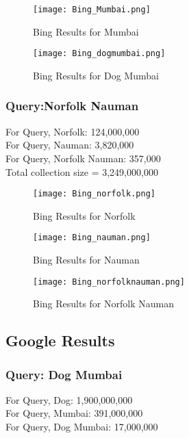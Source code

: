 \documentclass[12pt]{report}
\begin{document}
\begin{figure}[ht] 
  \centering
  \texttt{[image: Bing\_Mumbai.png]}
  \caption{Bing Results for Mumbai}
  \label{fig:2}
\end{figure}

\begin{figure}[ht] 
  \centering
  \texttt{[image: Bing\_dogmumbai.png]}
  \caption{Bing Results for Dog Mumbai}
  \label{fig:3}
\end{figure}

\subsubsection{Query:Norfolk Nauman}
For Query, Norfolk: 124,000,000\\
For Query, Nauman: 3,820,000\\
For Query, Norfolk Nauman: 357,000\\

Total collection size = 3,249,000,000\\

\begin{figure}[ht] 
  \centering
  \texttt{[image: Bing\_norfolk.png]}
  \caption{Bing Results for Norfolk}
  \label{fig:4}
\end{figure}

\begin{figure}[ht] 
  \centering
  \texttt{[image: Bing\_nauman.png]}
  \caption{Bing Results for Nauman}
  \label{fig:5}
\end{figure}

\begin{figure}[ht] 
  \centering
  \texttt{[image: Bing\_norfolknauman.png]}
  \caption{Bing Results for Norfolk Nauman}
  \label{fig:6}
\end{figure}

\subsection{Google Results}
\subsubsection{Query: Dog Mumbai}
For Query, Dog: 1,900,000,000\\
For Query, Mumbai: 391,000,000\\
For Query, Dog Mumbai: 17,000,000\\
\end{document}
